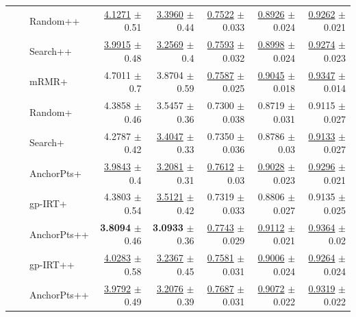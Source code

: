 \begin{longtable}{llp{}rrrrr}
 &  & Random++ & \underline{4.1271} {\scriptsize $\pm$ 0.51} & \underline{3.3960} {\scriptsize $\pm$ 0.44} & \underline{0.7522} {\scriptsize $\pm$ 0.033} & \underline{0.8926} {\scriptsize $\pm$ 0.024} & \underline{0.9262} {\scriptsize $\pm$ 0.021} \\
 &  & Search++ & \underline{3.9915} {\scriptsize $\pm$ 0.48} & \underline{3.2569} {\scriptsize $\pm$ 0.4} & \underline{0.7593} {\scriptsize $\pm$ 0.032} & \underline{0.8998} {\scriptsize $\pm$ 0.024} & \underline{0.9274} {\scriptsize $\pm$ 0.023} \\
 &  & mRMR+ & 4.7011 {\scriptsize $\pm$ 0.7} & 3.8704 {\scriptsize $\pm$ 0.59} & \underline{0.7587} {\scriptsize $\pm$ 0.025} & \underline{0.9045} {\scriptsize $\pm$ 0.018} & \underline{0.9347} {\scriptsize $\pm$ 0.014} \\
 &  & Random+ & 4.3858 {\scriptsize $\pm$ 0.46} & 3.5457 {\scriptsize $\pm$ 0.36} & 0.7300 {\scriptsize $\pm$ 0.038} & 0.8719 {\scriptsize $\pm$ 0.031} & 0.9115 {\scriptsize $\pm$ 0.027} \\
 &  & Search+ & 4.2787 {\scriptsize $\pm$ 0.42} & \underline{3.4047} {\scriptsize $\pm$ 0.33} & 0.7350 {\scriptsize $\pm$ 0.036} & 0.8786 {\scriptsize $\pm$ 0.03} & \underline{0.9133} {\scriptsize $\pm$ 0.027} \\
 &  & AnchorPts+ & \underline{3.9843} {\scriptsize $\pm$ 0.4} & \underline{3.2081} {\scriptsize $\pm$ 0.31} & \underline{0.7612} {\scriptsize $\pm$ 0.03} & \underline{0.9028} {\scriptsize $\pm$ 0.023} & \underline{0.9296} {\scriptsize $\pm$ 0.021} \\
 &  & gp-IRT+ & 4.3803 {\scriptsize $\pm$ 0.54} & \underline{3.5121} {\scriptsize $\pm$ 0.42} & 0.7319 {\scriptsize $\pm$ 0.033} & 0.8806 {\scriptsize $\pm$ 0.027} & 0.9135 {\scriptsize $\pm$ 0.025} \\
 &  & AnchorPts++ & \textbf{3.8094} {\scriptsize $\pm$ 0.46} & \textbf{3.0933} {\scriptsize $\pm$ 0.36} & \underline{0.7743} {\scriptsize $\pm$ 0.029} & \underline{0.9112} {\scriptsize $\pm$ 0.021} & \underline{0.9364} {\scriptsize $\pm$ 0.02} \\
 &  & gp-IRT++ & \underline{4.0283} {\scriptsize $\pm$ 0.58} & \underline{3.2367} {\scriptsize $\pm$ 0.45} & \underline{0.7581} {\scriptsize $\pm$ 0.031} & \underline{0.9006} {\scriptsize $\pm$ 0.024} & \underline{0.9264} {\scriptsize $\pm$ 0.024} \\
 &  & AnchorPts++ & \underline{3.9792} {\scriptsize $\pm$ 0.49} & \underline{3.2076} {\scriptsize $\pm$ 0.39} & \underline{0.7687} {\scriptsize $\pm$ 0.031} & \underline{0.9072} {\scriptsize $\pm$ 0.022} & \underline{0.9319} {\scriptsize $\pm$ 0.022} \\

\end{longtable}

